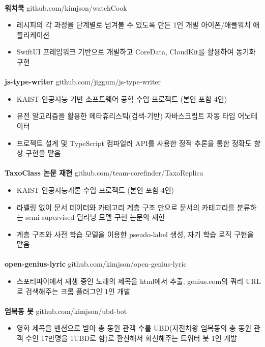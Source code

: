 \documentclass{article}
\begin{document}
\paragraph{}
\textbf{워치쿡} \hfill github.com/kimjson/watchCook
\begin{itemize}
    \setlength\itemsep{0.1em}
    \item 레시피의 각 과정을 단계별로 넘겨볼 수 있도록 만든 1인 개발 아이폰/애플워치 애플리케이션
    \item SwiftUI 프레임워크 기반으로 개발하고 CoreData, CloudKit를 활용하여 동기화 구현
\end{itemize}
\paragraph{}
\textbf{js-type-writer} \hfill github.com/jiggum/js-type-writer
\begin{itemize}
    \setlength\itemsep{0.1em}
    \item KAIST 인공지능 기반 소프트웨어 공학 수업 프로젝트 (본인 포함 4인)
    \item 유전 알고리즘을 활용한 메타휴리스틱(검색-기반) 자바스크립트 자동 타입 어노테이터
    \item 프로젝트 설계 및 TypeScript 컴파일러 API를 사용한 정적 추론을 통한 정확도 향상 구현을 맡음
\end{itemize}
\paragraph{}
\textbf{TaxoClass 논문 재현} \hfill github.com/team-corefinder/TaxoReplica
\begin{itemize}
    \setlength\itemsep{0.1em}
    \item KAIST 인공지능개론 수업 프로젝트 (본인 포함 4인)
    \item 라벨링 없이 문서 데이터와 카테고리 계층 구조 만으로 문서의 카테고리를 분류하는 semi-supervised 딥러닝 모델 구현 논문의 재현
    \item 계층 구조와 사전 학습 모델을 이용한 pseudo-label 생성, 자기 학습 로직 구현을 맡음
\end{itemize}
\paragraph{}
\textbf{open-genius-lyric} \hfill github.com/kimjson/open-genius-lyric
\begin{itemize}
    \setlength\itemsep{0.1em}
    \item 스포티파이에서 재생 중인 노래의 제목을 html에서 추출, genius.com의 쿼리 URL로 검색해주는 크롬 플러그인 1인 개발
\end{itemize}
\paragraph{}
\textbf{엄복동 봇} \hfill github.com/kimjson/ubd-bot
\begin{itemize}
    \setlength\itemsep{0.1em}
    \item 영화 제목을 멘션으로 받아 총 동원 관객 수를 UBD(자전차왕 엄복동의 총 동원 관객 수인 17만명을 1UBD로 함)로 환산해서 회신해주는 트위터 봇 1인 개발
\end{itemize}
\end{document}

